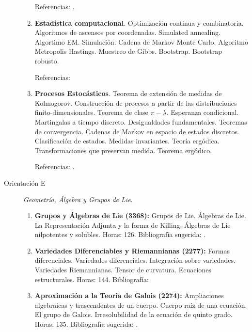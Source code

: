 \documentclass[a4paper, 12pt]{article}
\begin{document}
\begin{description}
\begin{enumerate}
 
Referencias:  \cite{anderson, Everitt,  Hair, Jimenez2005,  Cuadras, mardia, Penia, johnson, Rencher}.







\item \textbf{Estadística computacional}. 
Optimización   continua y combinatoria. Algoritmos de ascensos por coordenadas. Simulated annealing. Algortimo EM. Simulación. Cadena de Markov Monte Carlo. Algoritmo Metropolis Hastings. Muestreo de Gibbs. Bootstrap. Bootstrap robusto.  


Referencias:    \cite{wrma, wrre, giho}




\item \textbf{Procesos Estocásticos}. Teorema de extensión de  medidas de Kolmogorov. Construcción de procesos a partir
de las distribuciones finito-dimensionales. Teorema de  clase $\pi-\lambda$. Esperanza condicional. Martingalas a tiempo
discreto. Desigualdades fundamentales. Teoremas de convergencia. Cadenas de Markov en espacio de estados discretos.
Clasificación de estados. Medidas invariantes. Teoría ergódica. Transformaciones que preservan medida. Teorema ergódico.

 

 Referencias: \cite{bremaud,ferrari, shir,   varadhan}.



\end{enumerate}


\item[Orientación E]\emph{Geometría, Álgebra y Grupos de Lie}.

 \begin{enumerate}
\item\textbf{ Grupos y Álgebras de Lie (3368):}  Grupos de Lie. Álgebras de Lie. La Representación Adjunta y la forma de Killing. Álgebras de Lie nilpotentes y solubles.
Horas: 126. Bibliografía sugerida: \cite{boothby2003introduction, helgason2001differential}.

\item\textbf{ Variedades Diferenciables y Riemannianas  (2277):}
Formas diferenciales. Variedades diferenciales. Integración
sobre variedades. Variedades Riemannianas. Tensor de curvatura.  Ecuaciones estructurales.
 Horas: 144. Bibliografía: \cite{boothby2003introduction,do2012differential,spivak1988cálculo}

\item\textbf{ Aproximación a la Teoría de Galois (2274):} Ampliaciones algebraicas y trascendentes de un cuerpo.  Cuerpo raíz de una ecuación. El grupo de Galois. Irresolubilidad de la ecuación de quinto grado. Horas: 135. Bibliografía sugerida: \cite{herstein,artin}.
\end{enumerate}



\end{description}
\end{document}
